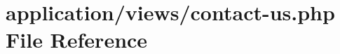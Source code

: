 \hypertarget{contact-us_8php}{\section{application/views/contact-\/us.php File Reference}
\label{contact-us_8php}
}
